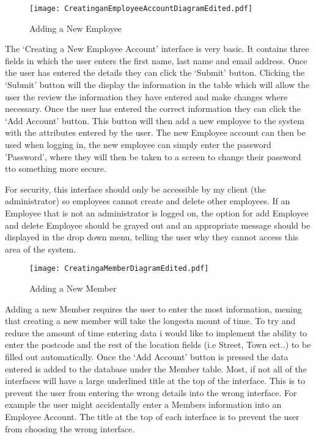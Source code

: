 \begin{figure}[H]
\caption{Adding a New Employee} \label{fig:Adding a New Employee Interface}
\hfill\texttt{[image: CreatinganEmployeeAccountDiagramEdited.pdf]}\hspace*{\fill}
\end{figure}

The `Creating a New Employee Account' interface is very basic. It contains three fields in which the user enters the first name, last name and email address. Once the user has entered the details they can click the `Submit' button. Clicking the `Submit' button will the display the information in the table which will allow the user the review the information they have entered and make changes where necessary. Once the user has entered the correct information they can click the `Add Account' button. This button will then add a new employee to the system with the attributes entered by the user. The new Employee account can then be used when logging in, the new employee can simply enter the password 'Password', where they will then be taken to a screen to change their password tto something more secure. \par

For security, this interface should only be accessible by my client (the administrator) so employees cannot create and delete other employees. If an Employee that is not an administrator is logged on, the option for add Employee and delete Employee should be grayed out and an appropriate message should be displayed in the drop down menu, telling the user why they cannot access this area of the system. \par

\begin{figure}[H]
\caption{Adding a New Member} \label{fig:Adding a New Member Interface}
\hfill\texttt{[image: CreatingaMemberDiagramEdited.pdf]}\hspace*{\fill}
\end{figure}

Adding a new Member requires the user to enter the most information, mening that creating a new member will take the longesta mount of time. To try and reduce the amount of time entering data i would like to implement the ability to enter the postcode and the rest of the location fields (i.e Street, Town ect..) to be filled out automatically. Once the `Add Account' button is pressed the data entered is added to the database under the Member table. Most, if not all of the  interfaces will have a large underlined title at the top of the interface. This is to prevent the user from entering the wrong details into the wrong interface. For example the user might accidentally enter a Members information into an Employee Account. The title at the top of each interface is to prevent the user from choosing the wrong interface. \par

